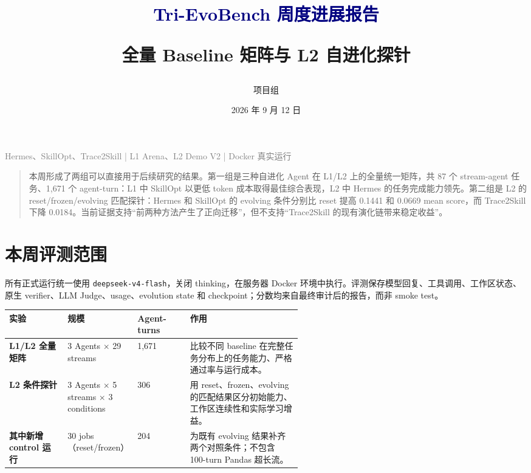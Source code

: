 \documentclass[11pt,a4paper]{article}
\title{\vspace{-1.2cm}\textcolor{navy}{Tri-EvoBench 周度进展报告}\par\vspace{5pt}\Large 全量 Baseline 矩阵与 L2 自进化探针}
\author{项目组}
\date{2026 年 9 月 12 日}
\newenvironment{callout}{\begin{quote}\small\color{navy}}{\end{quote}}
\newcommand{\code}[1]{\texttt{#1}}
\begin{document}
\maketitle
\thispagestyle{empty}

\begin{center}
\textcolor{gray}{Hermes、SkillOpt、Trace2Skill | L1 Arena、L2 Demo V2 | Docker 真实运行}
\end{center}

\vspace{5pt}
\begin{callout}
本周形成了两组可以直接用于后续研究的结果。第一组是三种自进化 Agent 在 L1/L2 上的全量统一矩阵，共 87 个 stream-agent 任务、1,671 个 agent-turn：L1 中 SkillOpt 以更低 token 成本取得最佳综合表现，L2 中 Hermes 的任务完成能力领先。第二组是 L2 的 reset/frozen/evolving 匹配探针：Hermes 和 SkillOpt 的 evolving 条件分别比 reset 提高 0.1441 和 0.0669 mean score，而 Trace2Skill 下降 0.0184。当前证据支持“前两种方法产生了正向迁移”，但不支持“Trace2Skill 的现有演化链带来稳定收益”。
\end{callout}

\section{本周评测范围}

所有正式运行统一使用 \code{deepseek-v4-flash}，关闭 thinking，在服务器 Docker 环境中执行。评测保存模型回复、工具调用、工作区状态、原生 verifier、LLM Judge、usage、evolution state 和 checkpoint；分数均来自最终审计后的报告，而非 smoke test。

\begin{center}
\renewcommand{\arraystretch}{1.25}
\begin{tabularx}{0.98\linewidth}{>{\bfseries}p{0.20\linewidth}p{0.18\linewidth}p{0.18\linewidth}X}
\toprule
实验 & 规模 & Agent-turns & 作用 \\
\midrule
L1/L2 全量矩阵 & 3 Agents $\times$ 29 streams & 1,671 & 比较不同 baseline 在完整任务分布上的任务能力、严格通过率与运行成本。\\
L2 条件探针 & 3 Agents $\times$ 5 streams $\times$ 3 conditions & 306 & 用 reset、frozen、evolving 的匹配结果区分初始能力、工作区连续性和实际学习增益。\\
其中新增 control 运行 & 30 jobs（reset/frozen） & 204 & 为既有 evolving 结果补齐两个对照条件；不包含 100-turn Pandas 超长流。\\
\bottomrule
\end{tabularx}
\end{center}
\end{document}
